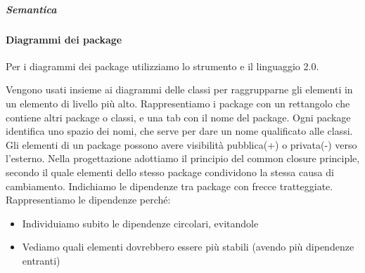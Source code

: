 		\subparagraph{Semantica} %
        
        \paragraph{Diagrammi dei package}\label{PP:Sviluppo:DiagrammiPackage}
        Per i diagrammi dei package utilizziamo lo strumento  e il linguaggio  2.0.\par
        Vengono usati insieme ai diagrammi delle classi per raggrupparne gli elementi in un elemento di livello più alto.
        Rappresentiamo i package con un rettangolo che contiene altri package o classi, e una tab con il nome del package.
        Ogni package identifica uno spazio dei nomi, che serve per dare un nome qualificato alle classi.
        Gli elementi di un package possono avere visibilità pubblica(+) o privata(-) verso l'esterno.
		Nella progettazione adottiamo il principio del common closure principle, secondo il quale elementi dello stesso
		package condividono la stessa causa di cambiamento.
        Indichiamo le dipendenze tra package con frecce tratteggiate.
        Rappresentiamo le dipendenze perché:
        \begin{itemize}
            \item Individuiamo subito le dipendenze circolari, evitandole
            \item Vediamo quali elementi dovrebbero essere più stabili (avendo più dipendenze entranti)
        \end{itemize}



